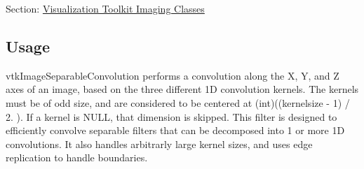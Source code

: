 Section\-: \hyperlink{sec_vtkimaging}{Visualization Toolkit Imaging Classes} \hypertarget{vtkwidgets_vtkxyplotwidget_Usage}{}\subsection{Usage}\label{vtkwidgets_vtkxyplotwidget_Usage}
vtk\-Image\-Separable\-Convolution performs a convolution along the X, Y, and Z axes of an image, based on the three different 1\-D convolution kernels. The kernels must be of odd size, and are considered to be centered at (int)((kernelsize -\/ 1) / 2. ). If a kernel is N\-U\-L\-L, that dimension is skipped. This filter is designed to efficiently convolve separable filters that can be decomposed into 1 or more 1\-D convolutions. It also handles arbitrarly large kernel sizes, and uses edge replication to handle boundaries.

